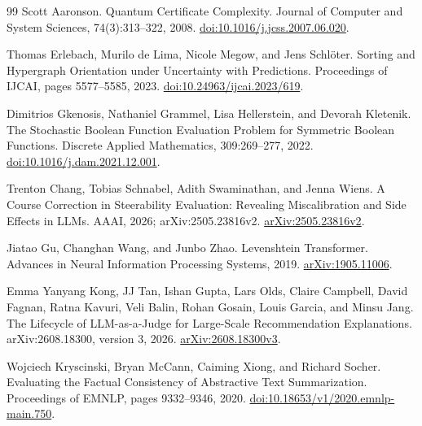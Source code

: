\documentclass[10pt,letterpaper,twocolumn]{article}
\begin{document}
\begin{thebibliography}{99}
Scott Aaronson.
\newblock Quantum Certificate Complexity.
\newblock Journal of Computer and System Sciences, 74(3):313--322, 2008.
\newblock \href{https://doi.org/10.1016/j.jcss.2007.06.020}{doi:10.1016/j.jcss.2007.06.020}.

Thomas Erlebach, Murilo de Lima, Nicole Megow, and Jens Schl\"oter.
\newblock Sorting and Hypergraph Orientation under Uncertainty with Predictions.
\newblock Proceedings of IJCAI, pages 5577--5585, 2023.
\newblock \href{https://www.ijcai.org/proceedings/2023/619}{doi:10.24963/ijcai.2023/619}.

Dimitrios Gkenosis, Nathaniel Grammel, Lisa Hellerstein, and Devorah Kletenik.
\newblock The Stochastic Boolean Function Evaluation Problem for Symmetric Boolean Functions.
\newblock Discrete Applied Mathematics, 309:269--277, 2022.
\newblock \href{https://doi.org/10.1016/j.dam.2021.12.001}{doi:10.1016/j.dam.2021.12.001}.


Trenton Chang, Tobias Schnabel, Adith Swaminathan, and Jenna Wiens.
\newblock A Course Correction in Steerability Evaluation: Revealing Miscalibration and Side Effects in LLMs.
\newblock AAAI, 2026; arXiv:2505.23816v2.
\newblock \href{https://arxiv.org/abs/2505.23816v2}{arXiv:2505.23816v2}.

Jiatao Gu, Changhan Wang, and Junbo Zhao.
\newblock Levenshtein Transformer.
\newblock Advances in Neural Information Processing Systems, 2019.
\newblock \href{https://arxiv.org/abs/1905.11006}{arXiv:1905.11006}.

Emma Yanyang Kong, JJ Tan, Ishan Gupta, Lars Olds, Claire Campbell, David Fagnan, Ratna Kavuri, Veli Balin, Rohan Gosain, Louis Garcia, and Minsu Jang.
\newblock The Lifecycle of LLM-as-a-Judge for Large-Scale Recommendation Explanations.
\newblock arXiv:2608.18300, version 3, 2026.
\newblock \href{https://arxiv.org/abs/2608.18300v3}{arXiv:2608.18300v3}.

Wojciech Kryscinski, Bryan McCann, Caiming Xiong, and Richard Socher.
\newblock Evaluating the Factual Consistency of Abstractive Text Summarization.
\newblock Proceedings of EMNLP, pages 9332--9346, 2020.
\newblock \href{https://aclanthology.org/2020.emnlp-main.750/}{doi:10.18653/v1/2020.emnlp-main.750}.


\end{thebibliography}
\end{document}
